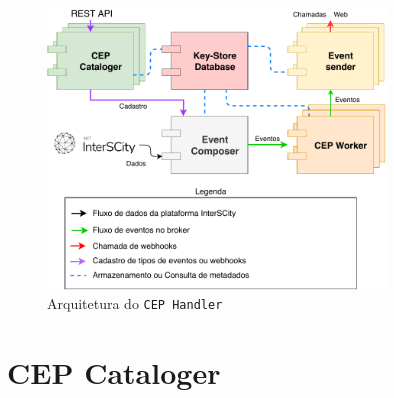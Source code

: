 \begin{figure}[hb!]
      \centering
      \includegraphics[width=0.8\textwidth]{figuras/neopr.pdf}
      \caption{Arquitetura do \texttt{CEP Handler}}
      \label{fig:system_architecture}
\end{figure}


\section{CEP Cataloger} \label{sec:cepcataloger}

